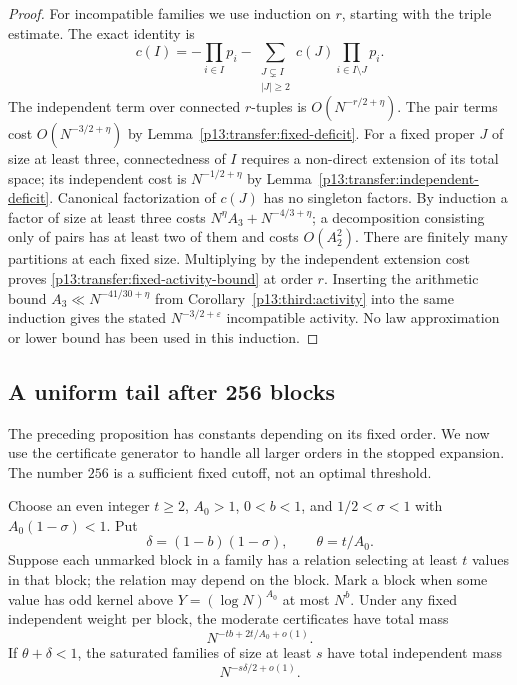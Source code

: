 \begin{proof}
For incompatible families we use induction on $r$, starting with the
triple estimate. The exact identity is
\begin{equation}
 c(I)=-\prod_{i\in I}p_i-
          \sum_{\substack{J\subsetneq I\\|J|\geq2}}
                     c(J)\prod_{i\in I\setminus J}p_i.
 \label{p13:transfer:incompatible-expansion}
\end{equation}
The independent term over connected $r$-tuples is
$O(N^{-r/2+\eta})$. The pair terms cost $O(N^{-3/2+\eta})$ by
Lemma~\ref{p13:transfer:fixed-deficit}.
For a fixed proper $J$ of size at least three, connectedness of $I$
requires a non-direct extension of its total space; its independent
cost is $N^{-1/2+\eta}$ by
Lemma~\ref{p13:transfer:independent-deficit}.
Canonical factorization of $c(J)$ has no singleton factors.
By induction a factor of size at least three costs
$N^\eta A_3+N^{-4/3+\eta}$; a decomposition consisting only of pairs
has at least two of them and costs $O(A_2^2)$.
There are finitely many partitions at each fixed size. Multiplying by
the independent extension cost proves
\eqref{p13:transfer:fixed-activity-bound} at order $r$.
Inserting the arithmetic bound $A_3\ll N^{-41/30+\eta}$ from
Corollary~\ref{p13:third:activity} into the same induction gives the
stated $N^{-3/2+\varepsilon}$ incompatible activity. No law
approximation or lower bound has been used in this induction.
\end{proof}

\subsection{A uniform tail after 256 blocks}

The preceding proposition has constants depending on its fixed order.
We now use the certificate generator to handle all larger orders in
the stopped expansion. The number $256$ is a sufficient fixed cutoff,
not an optimal threshold.

\begin{lemma}
\label{p13:transfer:anchor-budgets}
Choose an even integer $t\geq2$, $A_0>1$, $0<b<1$, and
$1/2<\sigma<1$ with $A_0(1-\sigma)<1$. Put
\[
 \delta=(1-b)(1-\sigma),\qquad \theta=t/A_0.
\]
Suppose each unmarked block in a family has a relation selecting at
least $t$ values in that block; the relation may depend on the block.
Mark a block when some value has odd kernel above
$Y=(\log N)^{A_0}$ at most $N^b$.
Under any fixed independent weight per block, the moderate certificates
have total mass
\begin{equation}
 N^{-tb+2t/A_0+o(1)}.
 \label{p13:transfer:moderate-budget}
\end{equation}
If $\theta+\delta<1$, the saturated families of size at least $s$
have total independent mass
\begin{equation}
 N^{-s\delta/2+o(1)}.
 \label{p13:transfer:saturated-budget}
\end{equation}
\end{lemma}


